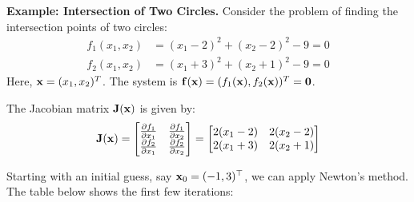 \begin{exampleBox}
\textbf{Example: Intersection of Two Circles.}
Consider the problem of finding the intersection points of two circles:
\begin{align*}
    f_1(x_1, x_2) &= (x_1 - 2)^2 + (x_2 - 2)^2 - 9 = 0 \\
    f_2(x_1, x_2) &= (x_1 + 3)^2 + (x_2 + 1)^2 - 9 = 0
\end{align*}
Here, $\mathbf{x} = (x_1, x_2)^T$. The system is $\mathbf{f}(\mathbf{x}) = (f_1(\mathbf{x}), f_2(\mathbf{x}))^T = \mathbf{0}$.

\begin{center}
\end{center}

The Jacobian matrix $\mathbf{J}(\mathbf{x})$ is given by:
{\renewcommand*{\arraystretch}{1.5}
\[
    \mathbf{J}(\mathbf{x}) = \begin{bmatrix}
    \frac{\partial f_1}{\partial x_1} & \frac{\partial f_1}{\partial x_2} \\
    \frac{\partial f_2}{\partial x_1} & \frac{\partial f_2}{\partial x_2}
    \end{bmatrix}
    = \begin{bmatrix}
    2(x_1 - 2) & 2(x_2 - 2) \\
    2(x_1 + 3) & 2(x_2 + 1)
    \end{bmatrix}
\]
}

Starting with an initial guess, say $\mathbf{x}_0 = (-1, 3)^\top$, we can apply Newton's method. The table below shows the first few iterations:


\end{exampleBox}
